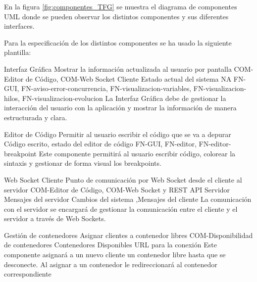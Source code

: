 En la figura \ref{fig:componentes_TFG} se muestra el diagrama de componentes UML \cite{Cook2017} donde se pueden observar los distintos componentes y sus diferentes interfaces.


Para la especificación de los distintos componentes se ha usado la siguiente plantilla: 

\printcomptemplate
\begin{component}{Interfaz Gráfica}
{Mostrar la información actualizada al usuario por pantalla}
{COM-Editor de Código, COM-Web Socket Cliente} %
{Estado actual del sistema} %
{NA} %
{FN-GUI, FN-aviso-error-concurrencia, FN-visualizacion-variables, FN-visualizacion-hilos, FN-visualizacion-evolucion} %
La Interfaz Gráfica debe de gestionar la interacción del usuario con la aplicación y mostrar la información de manera estructurada y clara. %
\end{component}

\begin{component}{Editor de Código}
    {Permitir al usuario escribir el código que se va a depurar}
    {\NA} %
    {\NA} %
    {Código escrito, estado del editor de código} %
    {FN-GUI, FN-editor, FN-editor-breakpoint} %
    Este componente permitirá al usuario escribir código, colorear la sintaxis y gestionar de forma visual los breakpoints. %
\end{component}

\begin{component}{Web Socket Cliente}
{Punto de comunicación por Web Socket desde el cliente al servidor}
{COM-Editor de Código, COM-Web Socket y REST API Servidor} %
{Mensajes del servidor} %
{Cambios del sistema ,Mensajes del cliente} %
{} %
La comunicación con el servidor se encargará de gestionar la comunicación entre el cliente y el servidor a través de Web Sockets. %
\end{component}


\begin{component}{Gestión de contenedores}
{Asignar clientes a contenedor libres}
{COM-Disponibilidad de contenedores} %
{Contenedores Disponibles} %
{URL para la conexión} %
{\NA} %
Este componente asignará a un nuevo cliente un contenedor libre hasta que se desconecte. Al asignar a un contenedor le redireccionará al contenedor correspondiente %
\end{component}

